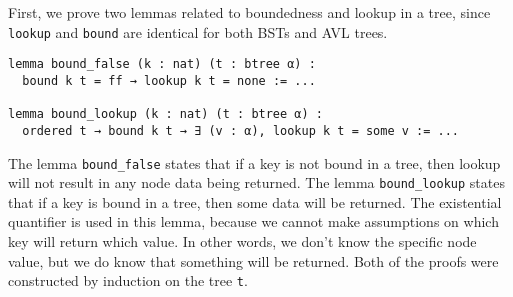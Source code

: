 First, we prove two lemmas related to boundedness and lookup in a tree, since \lstinline{lookup} and \lstinline{bound} are identical for both BSTs and AVL trees.

\begin{lstlisting}
lemma bound_false (k : nat) (t : btree α) :
  bound k t = ff → lookup k t = none := ...

lemma bound_lookup (k : nat) (t : btree α) :
  ordered t → bound k t → ∃ (v : α), lookup k t = some v := ...
\end{lstlisting}

The lemma \lstinline{bound_false} states that if a key is not bound in a tree, then lookup will not result in any node data being returned. The lemma \lstinline{bound_lookup} states that if a key is bound in a tree, then some data will be returned. The existential quantifier is used in this lemma, because we cannot make assumptions on which key will return which value. In other words, we don't know the specific node value, but we do know that something will be returned. Both of the proofs were constructed by induction on the tree \lstinline{t}.